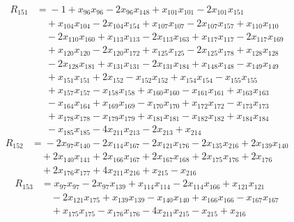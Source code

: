 \begin{align*}
R_{151}&={}-1 +x_{96}x_{96} -2x_{96}x_{148} +x_{101}x_{101} -2x_{101}x_{151}\\
&\quad{}+x_{104}x_{104} -2x_{104}x_{154} +x_{107}x_{107} -2x_{107}x_{157} +x_{110}x_{110}\\
&\quad{}-2x_{110}x_{160} +x_{113}x_{113} -2x_{113}x_{163} +x_{117}x_{117} -2x_{117}x_{169}\\
&\quad{}+x_{120}x_{120} -2x_{120}x_{172} +x_{125}x_{125} -2x_{125}x_{178} +x_{128}x_{128}\\
&\quad{}-2x_{128}x_{181} +x_{131}x_{131} -2x_{131}x_{184} +x_{148}x_{148} -x_{149}x_{149}\\
&\quad{}+x_{151}x_{151} +2x_{152} -x_{152}x_{152} +x_{154}x_{154} -x_{155}x_{155}\\
&\quad{}+x_{157}x_{157} -x_{158}x_{158} +x_{160}x_{160} -x_{161}x_{161} +x_{163}x_{163}\\
&\quad{}-x_{164}x_{164} +x_{169}x_{169} -x_{170}x_{170} +x_{172}x_{172} -x_{173}x_{173}\\
&\quad{}+x_{178}x_{178} -x_{179}x_{179} +x_{181}x_{181} -x_{182}x_{182} +x_{184}x_{184}\\
&\quad{}-x_{185}x_{185} -4x_{211}x_{213} -2x_{213} +x_{214}
\end{align*}
\begin{align*}
R_{152}&={}-2x_{97}x_{140} -2x_{114}x_{167} -2x_{121}x_{176} -2x_{135}x_{216} +2x_{139}x_{140}\\
&\quad{}+2x_{140}x_{141} +2x_{166}x_{167} +2x_{167}x_{168} +2x_{175}x_{176} +2x_{176}\\
&\quad{}+2x_{176}x_{177} +4x_{211}x_{216} +x_{215} -x_{216}
\end{align*}
\begin{align*}
R_{153}&={}x_{97}x_{97} -2x_{97}x_{139} +x_{114}x_{114} -2x_{114}x_{166} +x_{121}x_{121}\\
&\quad{}-2x_{121}x_{175} +x_{139}x_{139} -x_{140}x_{140} +x_{166}x_{166} -x_{167}x_{167}\\
&\quad{}+x_{175}x_{175} -x_{176}x_{176} -4x_{211}x_{215} -x_{215} +x_{216}
\end{align*}
\endgroup
